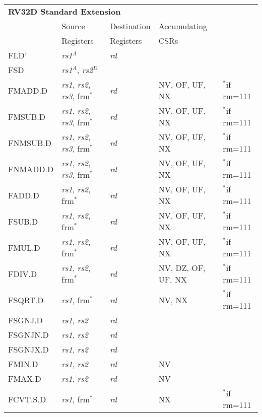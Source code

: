 \begin{tabular}{p{3cm}|p{25mm}|p{3cm}|p{4cm}|p{4cm}}
  \multicolumn{4}{l}{\bf RV32D Standard Extension} \\
  \cline{2-4}
   & Source    & Destination & Accumulating \\
   & Registers & Registers   & CSRs \\
  \cline{2-4}
   FLD$^\dagger$ & {\em rs1}$^A$ & {\em rd} &   & \\
   \cline{2-4}
   FSD & {\em rs1}$^A$, {\em rs2}$^D$ &  &   & \\
   \cline{2-4}
   FMADD.D & {\em rs1}, {\em rs2},  {\em rs3}, frm$^*$ & {\em rd} & NV, OF, UF, NX & $^*$if rm=111  \\
   \cline{2-4}
   FMSUB.D & {\em rs1}, {\em rs2},  {\em rs3}, frm$^*$ & {\em rd} & NV, OF, UF, NX & $^*$if rm=111  \\
   \cline{2-4}
   FNMSUB.D & {\em rs1}, {\em rs2},  {\em rs3}, frm$^*$ & {\em rd} & NV, OF, UF, NX & $^*$if rm=111  \\
   \cline{2-4}
   FNMADD.D & {\em rs1}, {\em rs2},  {\em rs3}, frm$^*$ & {\em rd} & NV, OF, UF, NX & $^*$if rm=111  \\
   \cline{2-4}
   FADD.D & {\em rs1}, {\em rs2}, frm$^*$ & {\em rd} & NV, OF, UF, NX & $^*$if rm=111  \\
   \cline{2-4}
   FSUB.D & {\em rs1}, {\em rs2}, frm$^*$ & {\em rd} & NV, OF, UF, NX & $^*$if rm=111  \\
   \cline{2-4}
   FMUL.D & {\em rs1}, {\em rs2}, frm$^*$ & {\em rd} & NV, OF, UF, NX & $^*$if rm=111  \\
   \cline{2-4}
   FDIV.D & {\em rs1}, {\em rs2}, frm$^*$ & {\em rd} & NV, DZ, OF, UF, NX & $^*$if rm=111  \\
   \cline{2-4}
   FSQRT.D & {\em rs1}, frm$^*$ & {\em rd} & NV, NX & $^*$if rm=111  \\
   \cline{2-4}
   FSGNJ.D & {\em rs1}, {\em rs2} & {\em rd} &   & \\
   \cline{2-4}
   FSGNJN.D & {\em rs1}, {\em rs2} & {\em rd} &   & \\
   \cline{2-4}
   FSGNJX.D & {\em rs1}, {\em rs2} & {\em rd} &   & \\
   \cline{2-4}
   FMIN.D & {\em rs1}, {\em rs2} & {\em rd} & NV &   \\
   \cline{2-4}
   FMAX.D & {\em rs1}, {\em rs2} & {\em rd} & NV &   \\
   \cline{2-4}
   FCVT.S.D & {\em rs1}, frm$^*$ & {\em rd} & NX & $^*$if rm=111  \\
   \cline{2-4}

\end{tabular}
